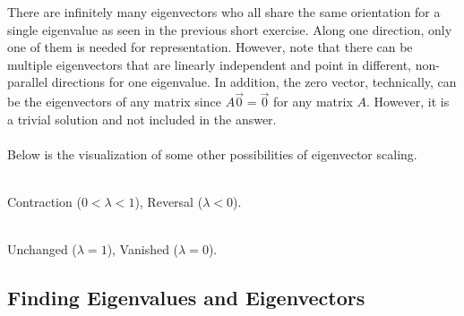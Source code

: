 There are infinitely many eigenvectors who all share the same orientation for a single eigenvalue as seen in the previous short exercise. Along one direction, only one of them is needed for representation. However, note that there can be multiple eigenvectors that are linearly independent and point in different, non-parallel directions for one eigenvalue. In addition, the zero vector, technically, can be the eigenvectors of any matrix since $A\vec{0} = \vec{0}$ for any matrix $A$. However, it is a trivial solution and not included in the answer.\\
\\
Below is the visualization of some other possibilities of eigenvector scaling.
\begin{center}
\\
Contraction ($0 < \lambda < 1$), Reversal ($\lambda < 0$). \\
\\
Unchanged ($\lambda = 1$), Vanished ($\lambda = 0$). 
\end{center}

\subsection{Finding Eigenvalues and Eigenvectors}

